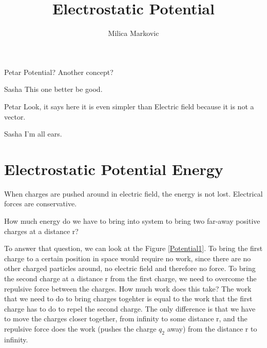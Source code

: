 \documentclass{ximera}
\title{Electrostatic Potential}
\author{Milica Markovic}
\begin{document}
  
\begin{abstract}  

\end{abstract}  
\maketitle    





\begin{dialogue}
\item[Petar] Potential? Another concept?
\item[Sasha] This one better be good.
\item[Petar] Look, it says here it is even simpler than Electric field because it is not a vector.
\item[Sasha] I'm all ears.
\end{dialogue}


\section{Electrostatic Potential Energy}


When charges are pushed around in electric field, the energy is not lost. Electrical forces are conservative. 


How much energy do we have to bring into system to bring two far-away positive charges at a distance r?

To answer that question, we can look at the Figure \ref{Potential1}. To bring the first charge to a certain position in space would require no work, since there are no other charged particles around, no electric field and therefore no force.  To bring the second charge at a distance r from the first charge, we need to overcome the repulsive force between the charges. How much work does this take? 
The work that we need to do to bring charges togehter is equal to the work that the first charge has to do to repel the second charge. The only difference is that we have to move the charges closer together, from infinity to some distance r, and the repulsive force does the work (pushes the charge $q_2$ away) from the distance r to infinity.
\end{document}
